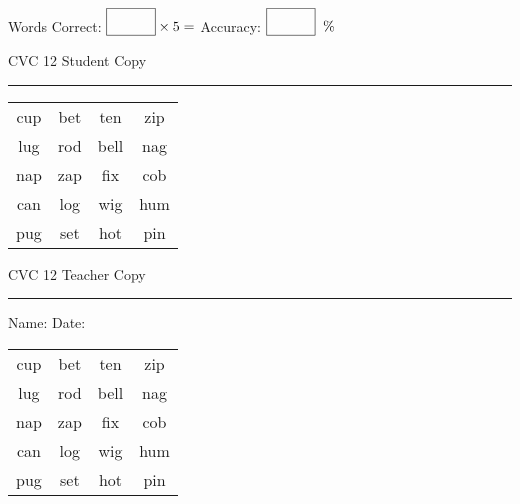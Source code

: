 \documentclass{memoir}
\begin{document}
\normalsize

Words Correct: $\fbox{\phantom{\huge 100}} \times 5 = $ Accuracy: $\fbox{\phantom{\huge 100}}\;\; \%$ 

\vfill

\newpage


\footnotesize \noindent
CVC 12 \hfill Student Copy
\smallskip
\hrule

\huge

\setlength{\tabcolsep}{14pt}
\def\arraystretch{2}

{\selectfont


\begin{vplace}[0.5]
\begin{center}
\begin{tabular}{cccc}
cup & bet & ten & zip \\
lug & rod & bell & nag \\
nap & zap & fix & cob \\
can & log & wig & hum \\
pug & set & hot & pin \\
\end{tabular}
\end{center}
\end{vplace}

}

\newpage

\footnotesize \noindent
CVC 12 \hfill Teacher Copy
\smallskip
\hrule

\normalsize

\vfill

\noindent
Name: \underline{\hspace{1.75in}} \hfill Date: \underline{\hspace{1in}}

\huge

{\selectfont


\begin{vplace}[0.5]
\begin{center}
\begin{tabular}{cccc}
cup & bet & ten & zip \\
lug & rod & bell & nag \\
nap & zap & fix & cob \\
can & log & wig & hum \\
pug & set & hot & pin \\
\end{tabular}
\end{center}
\end{vplace}



}
\end{document}
